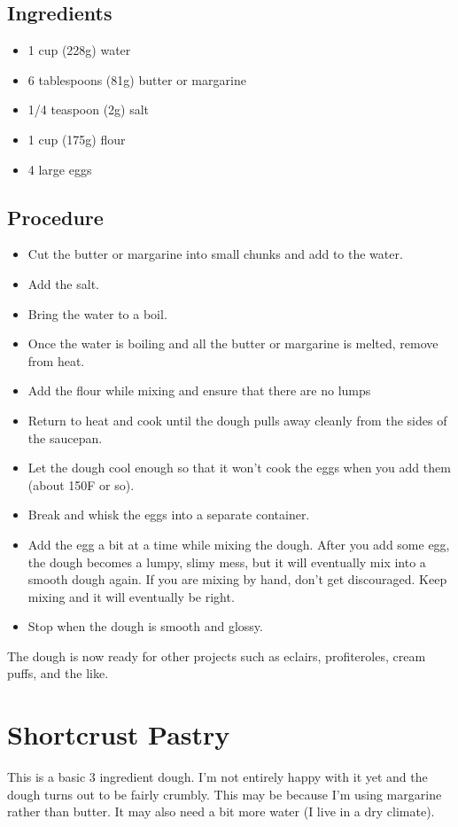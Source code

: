 \documentclass[10pt, openany]{book}
\begin{document}
\subsection{Ingredients}
\begin{itemize}
  \item 1 cup (228g) water
  \item 6 tablespoons (81g) butter or margarine
  \item 1/4 teaspoon (2g) salt
  \item 1 cup (175g) flour
  \item 4 large eggs
\end{itemize}
\subsection{Procedure}
\begin{itemize}
  \item Cut the butter or margarine into small chunks and add to the water.
  \item Add the salt.
  \item Bring the water to a boil.
  \item Once the water is boiling and all the butter or margarine is melted, remove from heat.
  \item Add the flour while mixing and ensure that there are no lumps
  \item Return to heat and cook until the dough pulls away cleanly from the sides of the saucepan.
  \item Let the dough cool enough so that it won't cook the eggs when you add them (about 150\degree{}F or so).
  \item Break and whisk the eggs into a separate container.
  \item Add the egg a bit at a time while mixing the dough.  After you add some egg, the dough becomes a lumpy, slimy mess, but it will eventually mix into a smooth dough again.  If you are mixing by hand, don't get discouraged.  Keep mixing and it will eventually be right.
  \item Stop when the dough is smooth and glossy.
\end{itemize}
The dough is now ready for other projects such as eclairs, profiteroles, cream puffs, and the like.

\section{Shortcrust Pastry}
\label{pastry:shortcrust}
This is a basic 3 ingredient dough.  I'm not entirely happy with it yet and the dough turns out to be fairly crumbly.  This may be because I'm using margarine rather than butter.  It may also need a bit more water (I live in a dry climate).
\end{document}
